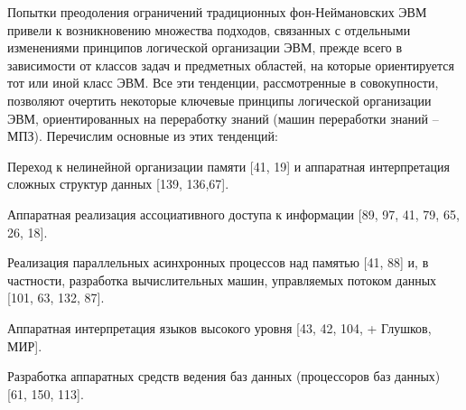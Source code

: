 Попытки преодоления ограничений традиционных фон-Неймановских ЭВМ привели к возникновению множества подходов, связанных с отдельными изменениями принципов логической организации ЭВМ, прежде всего в зависимости от классов задач и предметных областей, на которые ориентируется тот или иной класс ЭВМ. Все эти тенденции, рассмотренные в совокупности, позволяют очертить некоторые ключевые принципы логической организации ЭВМ, ориентированных на переработку знаний (машин переработки знаний -- МПЗ). Перечислим основные из этих тенденций:
\begin{textitemize}
\item Переход к нелинейной организации памяти [41, 19] и аппаратная интерпретация сложных структур данных [139, 136,67].
\item Аппаратная реализация ассоциативного доступа к информации [89, 97, 41, 79, 65, 26, 18].
\item Реализация параллельных асинхронных процессов над памятью [41, 88] и, в частности, разработка вычислительных машин, управляемых потоком данных [101, 63, 132, 87].
\item Аппаратная интерпретация языков высокого уровня [43, 42, 104, + Глушков, МИР].
\item Разработка аппаратных средств ведения баз данных (процессоров баз данных) [61, 150, 113].
\end{textitemize}
	
